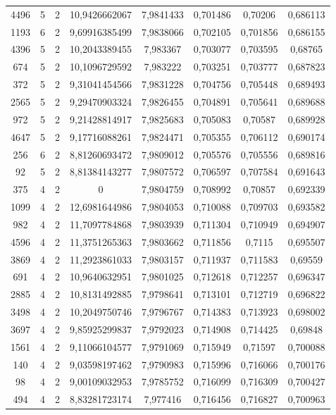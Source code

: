 \begin{longtable}{|c|c|c|c|c|c|c|c|}
4496 & 5 & 2 & 10,9426662067 & 7,9841433 & 0,701486 & 0,70206 & 0,686113 \\
1193 & 6 & 2 & 9,69916385499 & 7,9838066 & 0,702105 & 0,701856 & 0,686155 \\
4396 & 5 & 2 & 10,2043389455 & 7,983367 & 0,703077 & 0,703595 & 0,68765 \\
674 & 5 & 2 & 10,1096729592 & 7,983222 & 0,703251 & 0,703777 & 0,687823 \\
372 & 5 & 2 & 9,31041454566 & 7,9831228 & 0,704756 & 0,705448 & 0,689493 \\
2565 & 5 & 2 & 9,29470903324 & 7,9826455 & 0,704891 & 0,705641 & 0,689688 \\
972 & 5 & 2 & 9,21428814917 & 7,9825683 & 0,705083 & 0,70587 & 0,689928 \\
4647 & 5 & 2 & 9,17716088261 & 7,9824471 & 0,705355 & 0,706112 & 0,690174 \\
256 & 6 & 2 & 8,81260693472 & 7,9809012 & 0,705576 & 0,705556 & 0,689816 \\
92 & 5 & 2 & 8,81384143277 & 7,9807572 & 0,706597 & 0,707584 & 0,691643 \\
375 & 4 & 2 & 0 & 7,9804759 & 0,708992 & 0,70857 & 0,692339 \\
1099 & 4 & 2 & 12,6981644986 & 7,9804053 & 0,710088 & 0,709703 & 0,693582 \\
982 & 4 & 2 & 11,7097784868 & 7,9803939 & 0,711304 & 0,710949 & 0,694907 \\
4596 & 4 & 2 & 11,3751265363 & 7,9803662 & 0,711856 & 0,7115 & 0,695507 \\
3869 & 4 & 2 & 11,2923861033 & 7,9803157 & 0,711937 & 0,711583 & 0,69559 \\
691 & 4 & 2 & 10,9640632951 & 7,9801025 & 0,712618 & 0,712257 & 0,696347 \\
2885 & 4 & 2 & 10,8131492885 & 7,9798641 & 0,713101 & 0,712719 & 0,696822 \\
3498 & 4 & 2 & 10,2049750746 & 7,9796767 & 0,714383 & 0,713923 & 0,698002 \\
3697 & 4 & 2 & 9,85925299837 & 7,9792023 & 0,714908 & 0,714425 & 0,69848 \\
1561 & 4 & 2 & 9,11066104577 & 7,9791069 & 0,715949 & 0,71597 & 0,700088 \\
140 & 4 & 2 & 9,03598197462 & 7,9790983 & 0,715996 & 0,716066 & 0,700176 \\
98 & 4 & 2 & 9,00109032953 & 7,9785752 & 0,716099 & 0,716309 & 0,700427 \\
494 & 4 & 2 & 8,83281723174 & 7,977416 & 0,716456 & 0,716827 & 0,700963 \\

\end{longtable}
